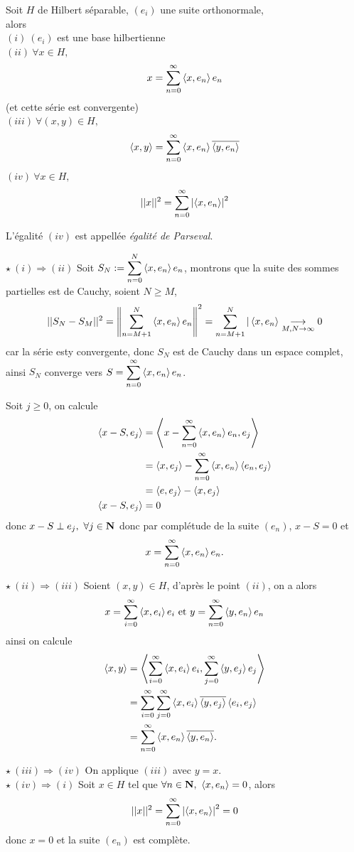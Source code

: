 \documentclass[a4paper,11pt, twoside]{article}
\begin{document}
\begin{Th}
  Soit $H$ de Hilbert séparable, $(e_i)$ une suite orthonormale,\\

  alors \lasse\\
  $(i)\ (e_i)$ est une base hilbertienne\\
  $(ii)\ \forall x\in H,$ 
  $$x=\sum_{n=0}^\infty\left\langle x,e_n \right\rangle e_n$$
  (et cette série est convergente)\\
  $(iii)\ \forall (x,y)\in H,$
  $$\left\langle x,y \right\rangle=\sum_{n=0}^\infty\left\langle x,e_n \right\rangle\overline{\left\langle y,e_n \right\rangle}$$
  $(iv)\ \forall x\in H,$ 
  $$||x||^2=\sum_{n=0}^\infty\left| \left\langle x,e_n \right\rangle\right|^2$$
\end{Th}


\begin{RQ}
  L'égalité $(iv)$ est appellée \emph{égalité de Parseval}.
\end{RQ}


\begin{Proof}
  $\star\ (i)\Rightarrow(ii)$ Soit $\displaystyle S_N:=\sum_{n=0}^N\left\langle x,e_n \right\rangle e_n$, montrons que la suite des sommes partielles est de Cauchy, soient $N\geqslant M$,
  $$||S_N-S_M||^2=\left\lVert\sum_{n=M+1}^N\left\langle x,e_n \right\rangle e_n\right\rVert^2=\sum_{n=M+1}^N|\left\langle x,e_n \right\rangle\underset{M,N\to\infty}{\longrightarrow}0$$
  car la série esty convergente, donc $S_N$ est de Cauchy dans un espace complet, ainsi $S_N$ converge vers $\displaystyle S=\displaystyle\sum_{n=0}^\infty\left\langle x,e_n \right\rangle e_n$.

  Soit $j\geqslant 0$, on calcule
  \begin{align*}
    \left\langle x-S,e_j \right\rangle&=\left\langle x-\displaystyle\sum_{n=0}^\infty\left\langle x,e_n \right\rangle e_n,e_j \right\rangle\\
    &=\left\langle x,e_j \right\rangle-\sum_{n=0}^\infty\left\langle x,e_n \right\rangle\left\langle e_n,e_j \right\rangle\\
    &=\left\langle e,e_j \right\rangle-\left\langle x,e_j \right\rangle\\
    \left\langle x-S,e_j \right\rangle&=0
  \end{align*}
  donc $x-S\perp e_j,\ \forall j\in\N$ donc par complétude de la suite $(e_n)$, $x-S=0$ et 
  $$x=\displaystyle\sum_{n=0}^\infty\left\langle x,e_n \right\rangle e_n.$$

  $\star\ (ii)\Rightarrow (iii)$ Soient $(x,y)\in H$, d'après le point $(ii)$, on a alors 
  $$x=\displaystyle\sum_{i=0}^\infty\left\langle x,e_i \right\rangle e_i\text{ et }y=\displaystyle\sum_{n=0}^\infty\left\langle y,e_n \right\rangle e_n$$
  ainsi on calcule
  \begin{align*}
    \left\langle x,y \right\rangle&=\left\langle \displaystyle\sum_{i=0}^\infty\left\langle x,e_i \right\rangle e_i,\displaystyle\sum_{j=0}^\infty\left\langle y,e_j \right\rangle e_j \right\rangle\\
    &=\displaystyle\sum_{i=0}^\infty\sum_{j=0}^\infty\left\langle x,e_i \right\rangle\overline{\left\langle y,e_j \right\rangle}\left\langle e_i,e_j \right\rangle\\
    &=\displaystyle\sum_{n=0}^\infty\left\langle x,e_n \right\rangle\overline{\left\langle y,e_n \right\rangle}.
  \end{align*}

  $\star\ (iii)\Rightarrow(iv)$ On applique $(iii)$ avec $y=x$.\\

  $\star\ (iv)\Rightarrow(i)$ Soit $x\in H$ tel que $\forall n\in\N,\ \ps{x,e_n}=0$, alors 
  $$||x||^2=\sum_{n=0}^\infty\left| \left\langle x,e_n \right\rangle\right|^2=0$$
  donc $x=0$ et la suite $(e_n)$ est complète.
\end{Proof}
\end{document}
